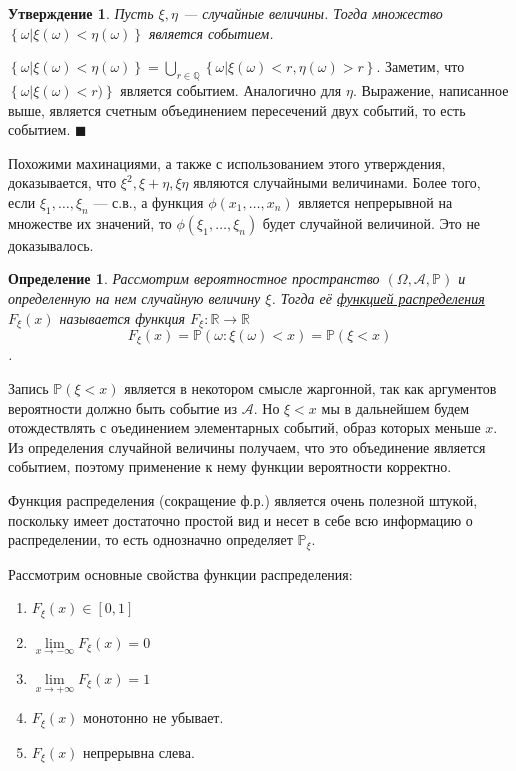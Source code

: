 \documentclass[12pt]{article}
\newtheorem{Def}{Определение}
\newtheorem{St}{Утверждение}
\newenvironment{Proof}{\par\noindent{\bf Доказательство}}{$\blacksquare$}
\numberwithin{Th}{section}
\numberwithin{Def}{section}
\numberwithin{Lem}{section}
\numberwithin{St}{section}
\numberwithin{equation}{section}
\newcommand\Set[2]{\left\{ #1 | #2 \right\}}
\newcommand\Pro{\mathbb{P}}
\newcommand\Ev{\mathscr{A}}
\newcommand\Real{\mathbb{R}}
\begin{document}
\begin{St}
Пусть $\xi, \eta$ --- случайные величины. Тогда множество $\Set{\omega}{\xi(\omega) < \eta(\omega)}$ является событием.
\end{St}
\begin{Proof}
$\Set{\omega}{\xi(\omega) < \eta(\omega)} = \bigcup\limits_{r \in \mathbb{Q}}\Set{\omega}{\xi(\omega) < r, \eta(\omega) > r}$. 
Заметим, что $\Set{\omega}{\xi(\omega) < r)}$ является событием. Аналогично для $\eta$. Выражение, написанное выше, является счетным объединением пересечений двух событий, то есть событием.
\end{Proof}

Похожими махинациями, а также с использованием этого утверждения, доказывается, что $\xi^2, \xi + \eta, \xi\eta$ являются случайными величинами.
Более того, если $\xi_1, \ldots, \xi_n$ --- с.в., а функция $\phi(x_1, \ldots, x_n)$ является непрерывной на множестве их значений, то $\phi(\xi_1, \ldots, \xi_n)$ будет случайной 
величиной. Это не доказывалось.

\begin{Def}
Рассмотрим вероятностное пространство $(\Omega, \Ev, \Pro)$ и определенную на нем случайную величину $\xi$. Тогда её \underline{функцией распределения $F_\xi(x)$}
 называется функция $F_\xi : \Real \to \Real$
$$F_\xi(x) = \Pro(\omega : \xi(\omega) < x) = \Pro(\xi < x)$$.
\end{Def}

Запись $\Pro(\xi < x)$ является в некотором смысле жаргонной, так как аргументов вероятности должно быть событие из $\Ev$. Но $\xi < x$ мы в дальнейшем будем 
отождествлять с оъединением элементарных событий, образ которых меньше $x$. Из определения случайной величины получаем, что это объединение является событием,
поэтому применение к нему функции вероятности корректно.

Функция распределения (сокращение ф.р.) является очень полезной штукой, поскольку имеет достаточно простой вид и несет в себе всю информацию о распределении, то есть однозначно 
определяет $\Pro_\xi$.

Рассмотрим основные свойства функции распределения:
\begin{enumerate}
	\item $F_\xi(x) \in [0, 1]$
	\item $\lim\limits_{x \to -\infty} F_\xi(x) = 0$
	\item $\lim\limits_{x \to +\infty} F_\xi(x) = 1$
	\item $F_\xi(x)$ монотонно не убывает.
	\item $F_\xi(x)$ непрерывна слева.
\end{enumerate}
\end{document}
